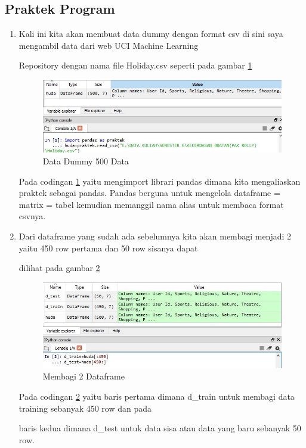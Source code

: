 \subsection{Praktek Program}
\begin{enumerate}
\item Kali ini kita akan membuat data dummy dengan format csv di sini saya mengambil data dari web UCI Machine Learning 
\par Repository dengan nama file Holiday.csv seperti pada gambar \ref{c4_6}
\begin{figure}[!htbp]
	\centerline{\includegraphics[width=1\textwidth]{figures/huda/chapter4/6.JPG}}
	\caption{Data Dummy 500 Data}
	\label{c4_6}
\end{figure}
\subitem Pada codingan \ref{c4_6} yaitu mengimport librari pandas dimana kita mengaliaskan praktek sebagai pandas. Pandas berguna untuk mengelola  dataframe = matrix = tabel kemudian memanggil nama alias untuk membaca format csvnya.
\item Dari dataframe yang sudah ada sebelumnya kita akan membagi menjadi 2 yaitu 450 row pertama dan 50 row sisanya dapat
\par dilihat pada gambar \ref{c4_7}
\begin{figure}[!htbp]
	\centerline{\includegraphics[width=1\textwidth]{figures/huda/chapter4/7.JPG}}
	\caption{Membagi 2 Dataframe}
	\label{c4_7}
\end{figure}
\subitem Pada codingan \ref{c4_7} yaitu baris pertama dimana d\_train untuk membagi data training sebanyak 450 row dan pada 
\par baris kedua dimana d\_test untuk data sisa atau data yang baru sebanyak 50 row.

\end{enumerate}
